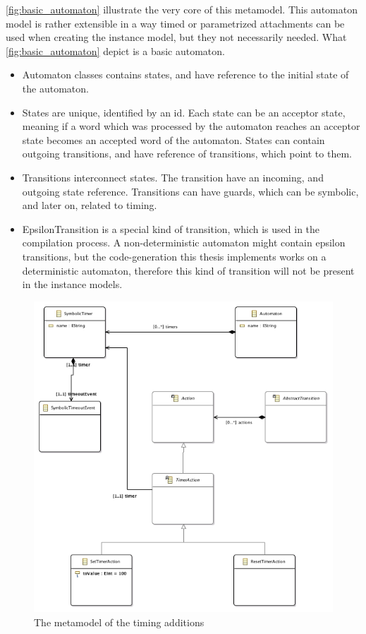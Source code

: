 \cref{fig:basic_automaton} illustrate the very core of this metamodel. This automaton model is rather extensible in a way timed or parametrized attachments can be used when creating the instance model, but they not necessarily needed. What \cref{fig:basic_automaton} depict is a basic automaton.
\begin{itemize}
	\item Automaton classes contains states, and have reference to the initial state of the automaton.
	\item States are unique, identified by an id. Each state can be an acceptor state, meaning if a word which was processed by the automaton reaches an acceptor state becomes an accepted word of the automaton. States can contain outgoing transitions, and have reference of transitions, which point to them.
	\item Transitions interconnect states. The transition have an incoming, and outgoing state reference. Transitions can have guards, which can be symbolic, and later on, related to timing.
	\item EpsilonTransition is a special kind of transition, which is used in the compilation process. A non-deterministic automaton might contain epsilon transitions, but the code-generation this thesis implements works on a deterministic automaton, therefore this kind of transition will not be present in the instance models.
\end{itemize}

\begin{figure}[h]
	\centering
	\includegraphics[width = \textwidth]{include/figures/timing_diagram}
	\caption{The \emf{} metamodel of the \viatrac{} timing additions}
\label{fig:timed_automaton}
\end{figure}

